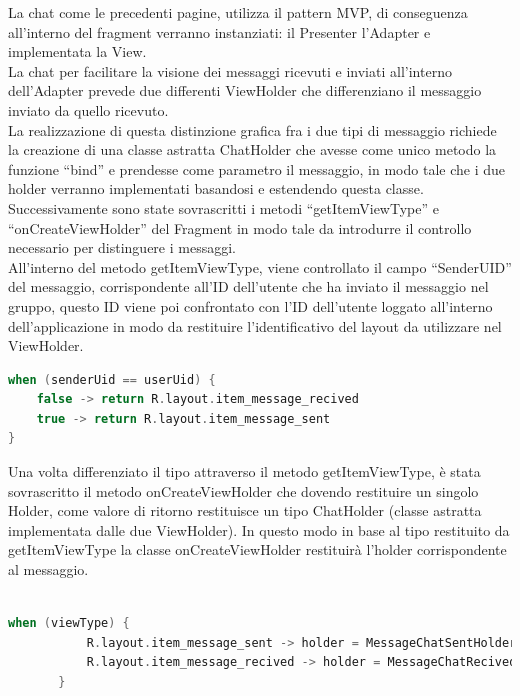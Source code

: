 La chat come le precedenti pagine, utilizza il pattern MVP, di conseguenza all'interno del fragment verranno instanziati: il Presenter l'Adapter e implementata la View.\\
La chat per facilitare la visione dei messaggi ricevuti e inviati all'interno dell'Adapter prevede due differenti ViewHolder che differenziano il messaggio inviato da quello ricevuto.\\
La realizzazione di questa distinzione grafica fra i due tipi di messaggio richiede la creazione di una classe astratta ChatHolder che avesse come unico metodo la funzione ``bind'' e prendesse come parametro il messaggio, in modo tale che i due holder verranno implementati basandosi e estendendo questa classe.\\
Successivamente sono state sovrascritti i metodi ``getItemViewType'' e ``onCreateViewHolder'' del Fragment in modo tale da introdurre il controllo necessario per distinguere i messaggi.\\
All'interno del metodo getItemViewType, viene controllato il campo ``SenderUID'' del messaggio, corrispondente all'ID dell'utente che ha inviato il messaggio nel gruppo, questo ID viene poi confrontato con l'ID dell'utente loggato all'interno dell'applicazione in modo da restituire l'identificativo del layout da utilizzare nel ViewHolder.
\newpage
\begin{lstlisting}[language=kotlin,caption={Logica della funzione getItemViewType della Chat}]
when (senderUid == userUid) {
    false -> return R.layout.item_message_recived
    true -> return R.layout.item_message_sent
}
\end{lstlisting}
Una volta differenziato il tipo attraverso il metodo getItemViewType, è stata sovrascritto il metodo onCreateViewHolder che dovendo restituire un singolo Holder, come valore di ritorno restituisce un tipo ChatHolder (classe astratta implementata dalle due ViewHolder). In questo modo in base al tipo restituito da getItemViewType la classe onCreateViewHolder restituirà l'holder corrispondente al messaggio.
\begin{lstlisting}[language=kotlin,caption={Logica della funzione onCreateViewHolder della chat}]

when (viewType) {
           R.layout.item_message_sent -> holder = MessageChatSentHolder(itemView = view, dateOfLastMessage = lastItem?.timestamp)
           R.layout.item_message_recived -> holder = MessageChatRecivedHolder(itemView = view, dateOfLastMessage = lastItem?.timestamp)
       }
   \end{lstlisting}

